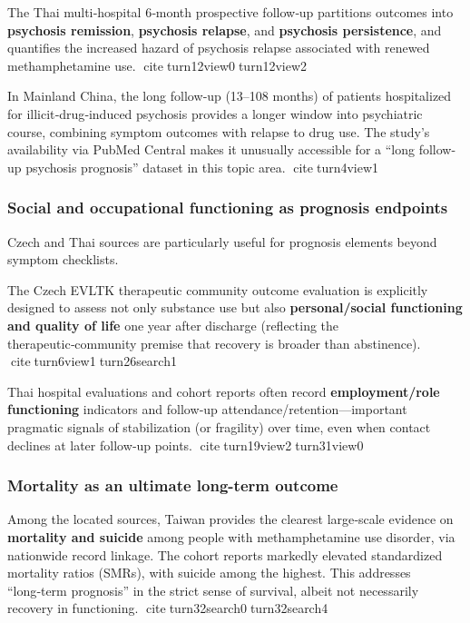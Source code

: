 The Thai multi‑hospital 6‑month prospective follow‑up partitions outcomes into \textbf{psychosis remission}, \textbf{psychosis relapse}, and \textbf{psychosis persistence}, and quantifies the increased hazard of psychosis relapse associated with renewed methamphetamine use. citeturn12view0turn12view2

In Mainland China, the long follow‑up (13--108 months) of patients hospitalized for illicit‑drug‑induced psychosis provides a longer window into psychiatric course, combining symptom outcomes with relapse to drug use. The study's availability via PubMed Central makes it unusually accessible for a ``long follow-up psychosis prognosis'' dataset in this topic area. citeturn4view1

\subsubsection{Social and occupational functioning as prognosis endpoints}\label{13_non_english-social-and-occupational-functioning-as-prognosis-endpoints}

Czech and Thai sources are particularly useful for prognosis elements beyond symptom checklists.

The Czech EVLTK therapeutic community outcome evaluation is explicitly designed to assess not only substance use but also \textbf{personal/social functioning and quality of life} one year after discharge (reflecting the therapeutic‑community premise that recovery is broader than abstinence). citeturn6view1turn26search1

Thai hospital evaluations and cohort reports often record \textbf{employment/role functioning} indicators and follow‑up attendance/retention---important pragmatic signals of stabilization (or fragility) over time, even when contact declines at later follow‑up points. citeturn19view2turn31view0

\subsubsection{Mortality as an ultimate long-term outcome}\label{13_non_english-mortality-as-an-ultimate-long-term-outcome}

Among the located sources, Taiwan provides the clearest large‑scale evidence on \textbf{mortality and suicide} among people with methamphetamine use disorder, via nationwide record linkage. The cohort reports markedly elevated standardized mortality ratios (SMRs), with suicide among the highest. This addresses ``long‑term prognosis'' in the strict sense of survival, albeit not necessarily recovery in functioning. citeturn32search0turn32search4

